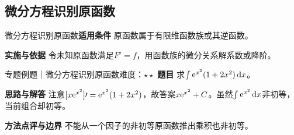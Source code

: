 \subsection{微分方程识别原函数}\label{mat:integrals_methods:i31}
\begin{method}{微分方程识别原函数}\textbf{适用条件} 原函数属于有限维函数族或其逆函数。\par\textbf{实施与依据} 令未知原函数满足$F\prime=f$，用函数族的微分关系解系数或降阶。\end{method}
\begin{example}{专题例题｜微分方程识别原函数}{难度：$\star\star$}
\textbf{题目} 求$\int\mathrm{e}^{x^2}(1+2x^2)\mathop{}\!\mathrm{d} x$。\par\textbf{思路与解答} 注意$[x\mathrm{e}^{x^2}]\prime=\mathrm{e}^{x^2}(1+2x^2)$，故答案$x\mathrm{e}^{x^2}+C$。虽然$\int\mathrm{e}^{x^2}\mathop{}\!\mathrm{d} x$非初等，当前组合却初等。\par\textbf{方法点评与边界} 不能从一个因子的非初等原函数推出乘积也非初等。
\end{example}
